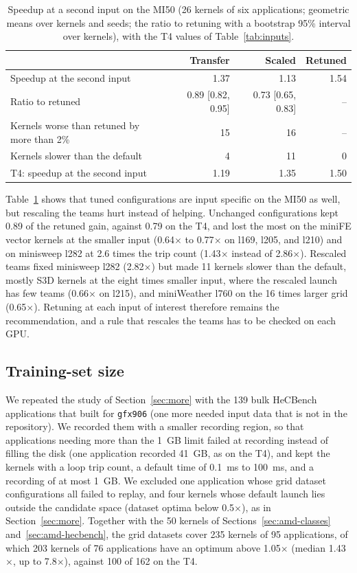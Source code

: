 \documentclass[10pt]{article}
\newcommand{\x}{\ensuremath{\times}}
\newcommand{\code}[1]{\texttt{#1}}
\begin{document}
\begin{table}[t]
\centering
\caption{Speedup at a second input on the MI50 (26 kernels of six applications; geometric means over kernels and seeds; the ratio to retuning with a bootstrap 95\% interval over kernels), with the T4 values of Table~\ref{tab:inputs}.}
\label{tab:mi50inputs}
\small
\begin{tabular}{lrrr}
\toprule
& Transfer & Scaled & Retuned \\
\midrule
Speedup at the second input & 1.37 & 1.13 & 1.54 \\
Ratio to retuned & 0.89 [0.82, 0.95] & 0.73 [0.65, 0.83] & -- \\
Kernels worse than retuned by more than 2\% & 15 & 16 & -- \\
Kernels slower than the default & 4 & 11 & 0 \\
T4: speedup at the second input & 1.19 & 1.35 & 1.50 \\
\bottomrule
\end{tabular}
\end{table}

Table~\ref{tab:mi50inputs} shows that tuned configurations are input specific
on the MI50 as well, but rescaling the teams hurt instead of helping. Unchanged
configurations kept 0.89 of the retuned gain, against 0.79 on the T4, and lost
the most on the miniFE vector kernels at the smaller input (0.64\x{} to
0.77\x{} on l169, l205, and l210) and on minisweep l282 at 2.6 times the trip
count (1.43\x{} instead of 2.86\x{}). Rescaled teams fixed minisweep l282
(2.82\x{}) but made 11 kernels slower than the default, mostly S3D kernels at
the eight times smaller input, where the rescaled launch has few teams (0.66\x{}
on l215), and miniWeather l760 on the 16 times larger grid (0.65\x{}). Retuning
at each input of interest therefore remains the recommendation, and a rule that
rescales the teams has to be checked on each GPU.

\subsection{Training-set size}
\label{sec:amd-more}
We repeated the study of Section~\ref{sec:more} with the 139 bulk HeCBench
applications that built for \code{gfx906} (one more needed input data that is
not in the repository). We recorded them with a smaller recording region, so
that applications needing more than the 1~GB limit failed at recording instead
of filling the disk (one application recorded 41~GB, as on the T4), and kept the
kernels with a loop trip count, a default time of 0.1~ms to 100~ms, and a
recording of at most 1~GB. We excluded one application whose grid dataset
configurations all failed to replay, and four kernels whose default launch lies
outside the candidate space (dataset optima below 0.5\x{}), as in
Section~\ref{sec:more}. Together with the 50 kernels of
Sections~\ref{sec:amd-classes} and~\ref{sec:amd-hecbench}, the grid datasets
cover 235 kernels of 95 applications, of which 203 kernels of 76 applications
have an optimum above 1.05\x{} (median 1.43\x{}, up to 7.8\x{}), against 100 of
162 on the T4.
\end{document}
